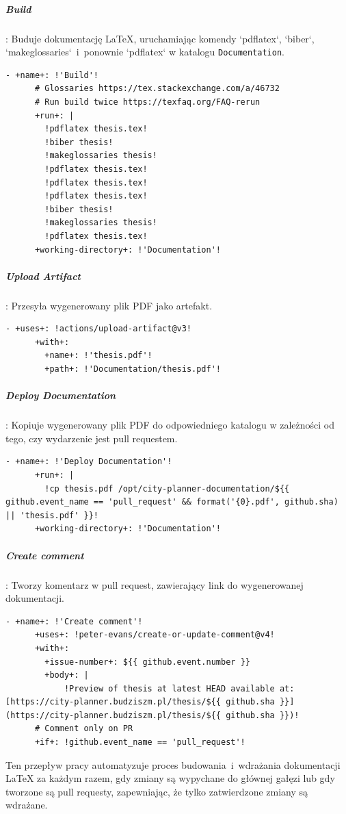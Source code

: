 \subparagraph{Build}: Buduje dokumentację LaTeX, uruchamiając komendy `pdflatex`, `biber`, `makeglossaries`~i~ponownie `pdflatex` w katalogu \texttt{\textcolor{codeblue}{Documentation}}.
\begin{lstlisting}[style=yaml-colored]
    - +name+: !'Build'!
      # Glossaries https://tex.stackexchange.com/a/46732
      # Run build twice https://texfaq.org/FAQ-rerun
      +run+: |
        !pdflatex thesis.tex!
        !biber thesis!
        !makeglossaries thesis!
        !pdflatex thesis.tex!
        !pdflatex thesis.tex!
        !pdflatex thesis.tex!
        !biber thesis!
        !makeglossaries thesis!
        !pdflatex thesis.tex!
      +working-directory+: !'Documentation'!
\end{lstlisting}

\subparagraph{Upload Artifact}: Przesyła wygenerowany plik PDF jako artefakt.
\begin{lstlisting}[style=yaml-colored]
    - +uses+: !actions/upload-artifact@v3!
      +with+:
        +name+: !'thesis.pdf'!
        +path+: !'Documentation/thesis.pdf'!
\end{lstlisting}

\subparagraph{Deploy Documentation}: Kopiuje wygenerowany plik PDF do odpowiedniego katalogu w zależności od tego, czy wydarzenie jest pull requestem.
\begin{lstlisting}[style=yaml-colored]
    - +name+: !'Deploy Documentation'!
      +run+: |
        !cp thesis.pdf /opt/city-planner-documentation/${{ github.event_name == 'pull_request' && format('{0}.pdf', github.sha) || 'thesis.pdf' }}!
      +working-directory+: !'Documentation'!
\end{lstlisting}

\subparagraph{Create comment}: Tworzy komentarz w pull request, zawierający link do wygenerowanej dokumentacji.
\begin{lstlisting}[style=yaml-colored]
    - +name+: !'Create comment'!
      +uses+: !peter-evans/create-or-update-comment@v4!
      +with+:
        +issue-number+: ${{ github.event.number }}
        +body+: |
            !Preview of thesis at latest HEAD available at: [https://city-planner.budziszm.pl/thesis/${{ github.sha }}](https://city-planner.budziszm.pl/thesis/${{ github.sha }})!
      # Comment only on PR
      +if+: !github.event_name == 'pull_request'!
\end{lstlisting}

Ten przepływ pracy automatyzuje proces budowania~i~wdrażania dokumentacji LaTeX za każdym razem, gdy zmiany są wypychane do głównej gałęzi lub gdy tworzone są pull requesty, zapewniając, że tylko zatwierdzone zmiany są wdrażane.

